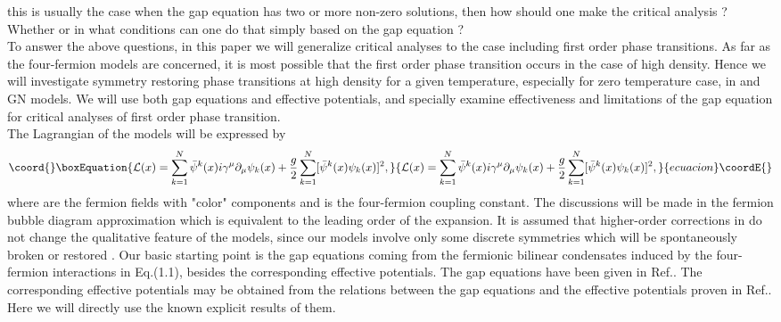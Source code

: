 \documentclass[a4paper,eqsecnum]{revtex4}
\begin{document}
this is usually the case when the gap equation has two or more non-zero solutions, 
then how should one make the critical analysis ?  Whether or in what conditions can 
one do that simply based on the gap equation ?  \\
\indent To answer the above questions, in this paper we will generalize 
critical analyses to the case including first order phase transitions. As far as the 
four-fermion models are concerned, it is most possible that the first order phase 
transition occurs in the case of high density. Hence we will investigate symmetry 
restoring phase transitions at high density for a given temperature, especially for 
zero temperature case, in \coordHE{} and \coordHE{} GN models. We will use both gap equations 
and effective potentials, and specially examine effectiveness and limitations of the 
gap equation for critical analyses of first order phase transition. \\
\indent The Lagrangian of the models will be expressed by
\begin{equation}\coord{}\boxEquation{
{\cal L}(x)=\sum_{k=1}^N\bar{\psi}^k(x)i\gamma^{\mu}\partial_{\mu}\psi_k(x)+
              \frac{g}{2}\sum_{k=1}^N[\bar{\psi}^k(x)\psi_k(x)]^2,
}{
{\cal L}(x)=\sum_{k=1}^N\bar{\psi}^k(x)i\gamma^{\mu}\partial_{\mu}\psi_k(x)+
              \frac{g}{2}\sum_{k=1}^N[\bar{\psi}^k(x)\psi_k(x)]^2,
}{ecuacion}\coordE{}\end{equation}%
where \coordHE{}  are the fermion fields with \coordHE{} "color" components and \coordHE{} is 
the four-fermion coupling constant. The discussions will be made in the fermion bubble 
diagram approximation which is equivalent to the leading order of the \coordHE{} expansion. 
It is assumed that higher-order corrections in \coordHE{} do not change the qualitative 
feature of the models, since our models involve only some discrete symmetries which 
will be spontaneously broken or restored \cite{kn:18}. Our basic starting point is 
the gap equations coming from the fermionic bilinear condensates induced by the 
four-fermion interactions in Eq.(1.1), besides the corresponding effective 
potentials. The gap equations have been given in Ref.\cite{kn:16,kn:17}.  The 
corresponding effective potentials may be obtained from the relations between the 
gap equations and the effective potentials proven in Ref.\cite{kn:14}. Here we will 
directly use the known explicit results of them. \\
\end{document}
